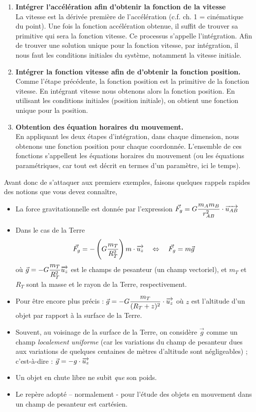 \documentclass[11pt,a4paper]{article}
\begin{document}
\begin{mdframed}[backgroundcolor=blue!5]
\begin{enumerate}
    \item \textbf{Intégrer l'accélération afin d'obtenir la fonction de la vitesse}\\
    La vitesse est la dérivée première de l'accélération (c.f. ch. 1 = cinématique du point). Une fois la fonction accélération obtenue, il suffit de trouver sa primitive qui sera la fonction vitesse. Ce processus s'appelle l'intégration. Afin de trouver une solution unique pour la fonction vitesse, par intégration, il nous faut les conditions initiales du système, notamment la vitesse initiale. 
    \item \textbf{Intégrer la fonction vitesse afin de d'obtenir la fonction position.}\\
    Comme l'étape précédente, la fonction position est la primitive de la fonction vitesse. En intégrant vitesse nous obtenons alors la fonction position. En utilisant les conditions initiales (position initiale), on obtient une fonction unique pour la position. 
    \item \textbf{Obtention des équation horaires du mouvement. }\\
    En appliquant les deux étapes d'intégration, dans chaque dimension, nous obtenons une fonction position pour chaque coordonnée. L'ensemble de ces fonctions s'appellent les équations horaires du mouvement (ou les équations paramétriques, car tout est décrit en termes d'un paramètre, ici le temps). 
\end{enumerate}
\end{mdframed}

Avant donc de s'attaquer aux premiers exemples, faisons quelques rappels rapides des notions que vous devez connaître, 
\begin{itemize}
    \item La force gravitationnelle est donnée par l'expression $\Vec{F_g} = G\dfrac{m_Am_B}{r_{AB}^2}\cdot \overrightarrow{u_{AB}}$
    \item Dans le cas de la Terre  
    \[\Vec{F_g} = -\left(G\dfrac{m_T}{R_{T}^2}\right)m\cdot\overrightarrow{u_{z}} \quad \Leftrightarrow \quad \Vec{F_g} = m\Vec{g} \]
    où $\Vec{g} = -G\dfrac{m_T}{R_{T}^2}\overrightarrow{u_{z}}$ est le champs de pesanteur (un champ vectoriel), et $m_T$ et $R_T$ sont la masse et le rayon de la Terre, respectivement. 
    \item Pour être encore plus précis : $\Vec{g} = -G\dfrac{m_T}{(R_{T} + z)^2}\cdot \overrightarrow{u_{z}}$  où $z$ est l’altitude d’un objet par rapport à la surface de la Terre. 
    \item 	Souvent, au voisinage de la surface de la Terre, on considère $\Vec{g}$  comme un champ \textit{localement uniforme} (car les variations du champ de pesanteur dues aux variations de quelques centaines de mètres d’altitude sont négligeables) ; c’est-à-dire : $\Vec{g} = -g\cdot\overrightarrow{u_{z}}$
    \item Un objet en chute libre ne subit \textit{que} son poids. 
    \item Le repère adopté – normalement - pour l’étude des objets en mouvement dans un champ de pesanteur est cartésien.
\end{itemize}
\end{document}
